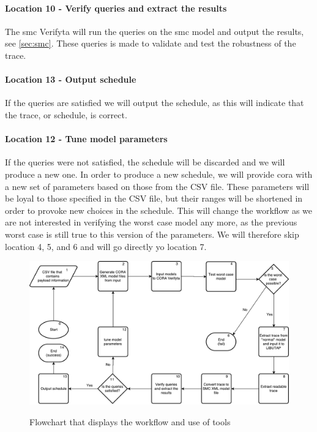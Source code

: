 \paragraph{Location 10 - Verify queries and extract the results} 
The \gls{smc} Verifyta will run the queries on the \gls{smc} model and output the results, see \cref{sec:smc}. 
These queries is made to validate and test the robustness of the trace.

\paragraph{Location 13 - Output schedule} 
If the queries are satisfied we will output the schedule, as this will indicate that the trace, or schedule, is correct.

\paragraph{Location 12 - Tune model parameters} 
If the queries were not satisfied, the schedule will be discarded and we will produce a new one. 
In order to produce a new schedule, we will provide \gls{cora} with a new set of parameters based on those from the CSV file. 
These parameters will be loyal to those specified in the CSV file, but their ranges will be shortened in order to provoke new choices in the schedule. 
This will change the workflow as we are not interested in verifying the worst case model any more, as the previous worst case is still true to this version of the parameters. 
We will therefore skip location 4, 5, and 6 and will go directly yo location 7.

\begin{figure}[h]
	\includegraphics[width=\textwidth]{graphics/tool_chain.pdf}
	\label{fig:tool1}
	\caption{Flowchart that displays the workflow and use of tools}
\end{figure}